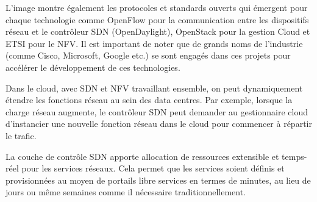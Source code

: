 L'image montre également les protocoles et standards ouverts qui émergent pour chaque technologie comme OpenFlow pour la communication entre les dispositifs réseau et le contrôleur SDN (OpenDaylight), OpenStack pour la gestion Cloud et ETSI pour le NFV. Il est important de noter que de grands noms de l’industrie (comme Cisco, Microsoft, Google etc.) se sont engagés dans ces projets pour accélérer le développement de ces technologies.

Dans le cloud, avec SDN et NFV travaillant ensemble, on peut dynamiquement étendre les fonctions réseau au sein des data centres. Par exemple, lorsque la charge réseau augmente, le contrôleur SDN peut demander au gestionnaire cloud d'instancier une nouvelle fonction réseau dans le cloud pour commencer à répartir le trafic. 



La couche de contrôle SDN apporte allocation de ressources extensible et temps-réel pour les services réseaux. Cela permet que les services soient définis et provisionnées au moyen de portails libre services en termes de minutes, au lieu de jours ou même semaines comme il nécessaire traditionnellement.

